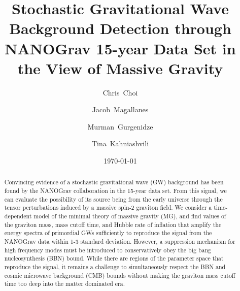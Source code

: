 \documentclass[prd,twocolumn,aps,psfig,nofootinbib,nobibnotes,superscriptaddress,preprintnumbers,times]{revtex4-2}
\begin{document}
\title{Stochastic Gravitational Wave Background Detection through NANOGrav 15-year Data Set in the View of Massive Gravity}

\date{\today}
\author{Chris~Choi}

\author{Jacob~Magallanes}

\author{Murman~Gurgenidze}

\author{Tina~Kahniashvili}

\begin{abstract}
Convincing evidence of a stochastic gravitational wave (GW) background has been found by the NANOGrav collaboration in the 15-year data set. From this signal, we can evaluate the possibility of its source being from the early universe through the tensor perturbations induced by a massive spin-2 graviton field. We consider a time-dependent model of the minimal theory of massive gravity (MG), and find values of the graviton mass, mass cutoff time, and Hubble rate of inflation that amplify the energy spectra of primordial GWs sufficiently to reproduce the signal from the NANOGrav data within 1-3 standard deviation. However, a suppression mechanism for high frequency modes must be introduced to conservatively obey the big bang nucleosynthesis (BBN) bound. While there are regions of the parameter space that reproduce the signal, it remains a challenge to simultaneously respect the BBN and cosmic microwave background (CMB) bounds without making the graviton mass cutoff time too deep into the matter dominated era.
\end{abstract}

\maketitle
\end{document}
